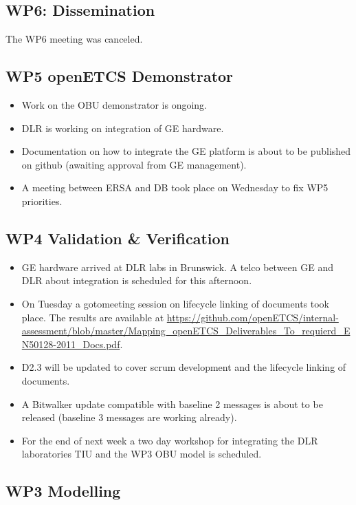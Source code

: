 \documentclass[a4paper, 11pt]{article}
\begin{document}
\subsection{WP6: Dissemination}

The WP6 meeting was canceled.
 
\subsection{WP5 openETCS Demonstrator}

\begin{itemize}
\item Work on the OBU demonstrator is ongoing.
\item DLR is working on integration of GE hardware.
\item Documentation on how to integrate the GE platform is about to be published on github (awaiting approval from GE management).
\item A meeting between ERSA and DB took place on Wednesday to fix WP5 priorities.
\end{itemize}

\subsection{WP4 Validation \& Verification}
\begin{itemize}
\item GE hardware arrived at DLR labs in Brunswick. A telco between GE and DLR about integration is scheduled for this afternoon.
\item On Tuesday a gotomeeting session on lifecycle linking of documents took place. The results are available at \url{https://github.com/openETCS/internal-assessment/blob/master/Mapping_openETCS_Deliverables_To_requierd_EN50128-2011_Docs.pdf}.
\item D2.3 will be updated to cover scrum development and the lifecycle linking of documents. 
\item A Bitwalker update compatible with baseline 2 messages is about to be released (baseline 3 messages are working already).
\item For the end of next week a two day workshop for integrating the DLR laboratories TIU and the WP3 OBU model is scheduled.
\end{itemize}

\subsection{WP3 Modelling}
\end{document}

